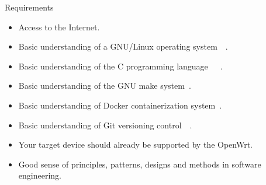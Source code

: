 \begin{withoutheadline}
    \begin{frame}{Requirements}
        \begin{itemize}[<+(1)->]
            \item Access to the Internet.
            \item Basic understanding of a GNU/Linux operating system~\cite{starch-how_linux_works}~\cite{starch-linux_command_line}.
            \item Basic understanding of the C programming language~\cite{prentice-c_programming_language}~\cite{wesley-c_primer_plus}~\cite{oreilly-understanding_and_using_c_pointers}.
            \item Basic understanding of the GNU make system~\cite{oreilly-managing_projects_with_gnu_make}.
            \item Basic understanding of Docker containerization system~\cite{turnbull-the_docker_book}.
            \item Basic understanding of Git versioning control~\cite{torvalds-git}~\cite{chacon-pro_git}.
            \item Your target device should already be supported by the OpenWrt.
            \item Good sense of principles, patterns, designs and methods in software engineering.
        \end{itemize}
    \end{frame}
\end{withoutheadline}